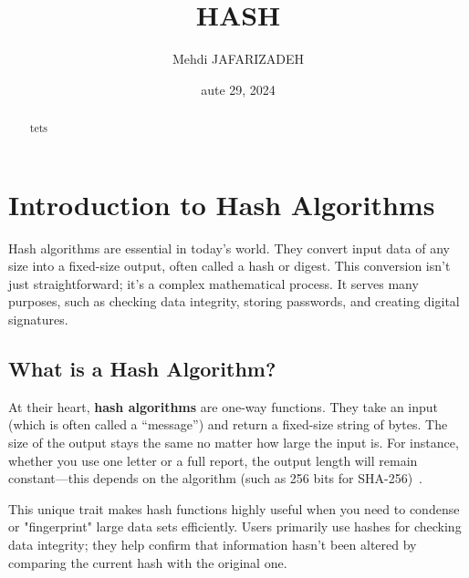 \documentclass[11pt,a4paper]{article}
\title{HASH}
\author{Mehdi JAFARIZADEH}
\date{aute 29, 2024}
\begin{document}
\maketitle

\begin{abstract}
    tets
\end{abstract}

\newpage

\section*{Introduction to Hash Algorithms}
Hash algorithms are essential in today’s world. They convert input data of any size into a fixed-size output, often called a hash or digest. This conversion isn’t just straightforward; it’s a complex mathematical process. It serves many purposes, such as checking data integrity, storing passwords, and creating digital signatures.


    \subsection*{What is a Hash Algorithm?}
    At their heart, \textbf{hash algorithms} are one-way functions. They take an input (which is often called a “message”) and return a fixed-size string of bytes. The size of the output stays the same no matter how large the input is. For instance, whether you use one letter or a full report, the output length will remain constant—this depends on the algorithm (such as 256 bits for SHA-256)~\cite{Hash-Algorithms}.

    This unique trait makes hash functions highly useful when you need to condense or "fingerprint" large data sets efficiently. Users primarily use hashes for checking data integrity; they help confirm that information hasn’t been altered by comparing the current hash with the original one.
\end{document}
